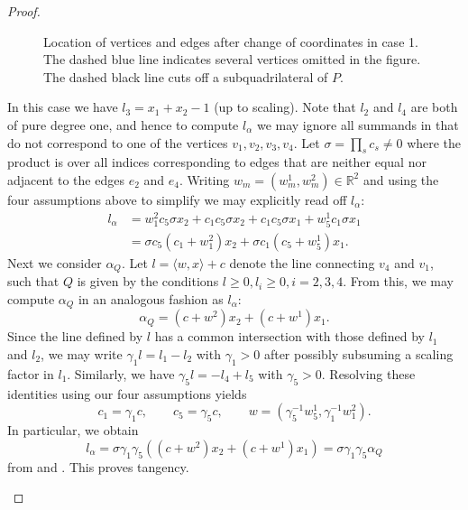 \documentclass[a4paper,10pt]{amsart}
\theoremstyle{definition}
\theoremstyle{plain}
\newcommand{\R}{{\mathbb R}}
\begin{document}
\begin{proof}
\begin{enumerate}
\begin{figure}[h]
\caption{Location of vertices and edges after change of coordinates in case 1. The dashed blue line indicates several vertices omitted in the figure. The dashed black line cuts off a subquadrilateral of $P$.}
    \label{fig:case1}
    \end{figure}
    In this case we have $l_3 = x_1+x_2 - 1$ (up to scaling). Note that $l_2$ and $l_4$ are both of pure degree one, and hence to compute $l_\alpha$ we may ignore all summands in  that do not correspond to one of the vertices $v_{1},v_2,v_{3}, v_4$. Let $\sigma = \prod_s c_s \neq 0$ where the product is over all indices corresponding to edges that are neither equal nor adjacent to the edges $e_2$ and $e_4$. Writing $w_m = (w_m^1, w_m^2) \in \R^2$ and using the four assumptions above to simplify  we may explicitly read off $l_\alpha$:
    \begin{equation} \label{eq:case1_LinTermRed}
        \begin{split}
        l_\alpha &= w_1^2 c_5 \sigma x_2 + c_1c_5 \sigma x_2 + c_1c_5 \sigma x_1 + w_5^1 c_1 \sigma x_1 \\
        &= \sigma c_5 (c_1 + w_1^2) x_2 + \sigma c_1 (c_5 + w_5^1)x_1.
        \end{split}
    \end{equation}
    Next we consider $\alpha_{Q}$. Let $l = \langle w, x \rangle + c$ denote the line connecting $v_4$ and $v_1$, such that $Q$ is given by the conditions $l \geq 0, l_i \geq 0, i = 2,3,4$. From this, we may compute $\alpha_{Q}$ in an analogous fashion as $l_\alpha$:
    \begin{equation} \label{eq:case1_tRed}
        \alpha_{Q} = (c + w^2)x_2 + (c + w^1)x_1.
    \end{equation}
    Since the line defined by $l$ has a common intersection with those defined by $l_1$ and $l_2$, we may write $\gamma_1 l = l_1 - l_2$ with $\gamma_1 > 0$ after possibly subsuming a scaling factor in $l_1$. Similarly, we have $\gamma_5 l = - l_4 + l_5$ with $\gamma_5 > 0$. Resolving these identities using our four assumptions yields
    \begin{equation*}
        c_1 = \gamma_1 c, \qquad c_5 = \gamma_5 c, \qquad w = (\gamma_5^{-1} w_5^1, \gamma_1^{-1} w_1 ^2).
    \end{equation*}
    In particular, we obtain
    \begin{equation*}
        l_\alpha = \sigma \gamma_1 \gamma_5 ((c + w^2)x_2 + (c + w^1)x_1) = \sigma \gamma_1 \gamma_5 \alpha_{Q}
    \end{equation*}
    from  and . This proves tangency.


\end{enumerate}
\end{proof}
\end{document}

